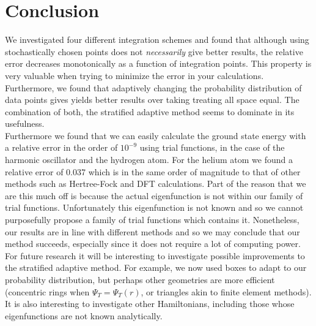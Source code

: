 
\section{Conclusion}
We investigated four different integration schemes and found that although using stochastically chosen points does not \textit{necessarily} give better results, the relative error decreases monotonically as a function of integration points. This property is very valuable when trying to minimize the error in your calculations. Furthermore, we found that adaptively changing the probability distribution of data points gives yields better results over taking treating all space equal. The combination of both, the stratified adaptive method seems to dominate in its usefulness. \\

Furthermore we found that we can easily calculate the ground state energy with a relative error in the order of $10^{-9}$ using trial functions, in the case of the harmonic oscillator and the hydrogen atom. For the helium atom we found a relative error of 0.037 which is in the same order of magnitude to that of other methods such as Hertree-Fock and DFT calculations. Part of the reason that we are this much off is because the actual eigenfunction is not within our family of trial functions. Unfortunately this eigenfunction is not known and so we cannot purposefully propose a family of trial functions which contains it. Nonetheless, our results are in line with different methods and so we may conclude that our method succeeds, especially since it does not require a lot of computing power. \\


For future research it will be interesting to investigate possible improvements to the stratified adaptive method. For example, we now used boxes to adapt to our probability distribution, but perhaps other geometries are more efficient (concentric rings when $\Psi_T = \Psi_T(r)$, or triangles akin to finite element methods). It is also interesting to investigate other Hamiltonians, including those whose eigenfunctions are not known analytically.
